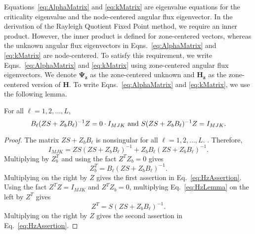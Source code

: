 Equations~\ref{eq:AlphaMatrix} and \ref{eq:kMatrix} are eigenvalue equations for the criticality eigenvalue and the node-centered angular flux eigenvector. In the derivation of the Rayleigh Quotient Fixed Point method, we require an inner product. However, the inner product is defined for zone-centered vectors, whereas the unknown angular flux eigenvectors in Eqns.~\ref{eq:AlphaMatrix} and \ref{eq:kMatrix} are node-centered. To satisfy this requirement, we write Eqns.~\ref{eq:AlphaMatrix} and \ref{eq:kMatrix} using zone-centered angular flux eigenvectors. We denote $\mathbf{\Psi_{z}}$ as the zone-centered unknown and $\mathbf{H_{z}}$ as the zone-centered version of $\mathbf{H}$. To write Eqns.~\ref{eq:AlphaMatrix} and \ref{eq:kMatrix}, we use the following lemma.
\begin{lemma}
For all $\ell = 1, 2, \dots, L$,
	\begin{equation}
		B_{\ell}(ZS + Z_{b}B_{\ell})^{-1}Z = 0 \cdot I_{MJK} \text{ and } S(ZS + Z_{b}B_{\ell})^{-1}Z = I_{MJK}. \\
		\label{eq:HzAssertion}
	\end{equation}
	\label{lemma:Hz}
\end{lemma}
\begin{proof}
	The matrix $ZS + Z_{b}B_{\ell}$ is nonsingular for all $\ell = 1, 2, \dots, L.$ \cite{brown_linear_1995}. Therefore,
	\begin{equation}
		I_{MJK} = ZS(ZS + Z_{b}B_{\ell})^{-1} + Z_{b}B_{\ell}(ZS + Z_{b}B_{\ell})^{-1}.
		\label{eq:HzLemma}
	\end{equation}
	Multiplying by $Z_{b}^{T}$ and using the fact $Z^{T}Z_{b} = 0$ gives
	\begin{equation}
		Z_{b}^{T} = B_{\ell}(ZS + Z_{b}B_{\ell})^{-1}.
	\end{equation}
	Multiplying on the right by $Z$ gives the first assertion in Eq.~\ref{eq:HzAssertion}. Using the fact $Z^{T}Z = I_{MJK}$ and $Z^{T}Z_{b} = 0$, multiplying Eq.~\ref{eq:HzLemma} on the left by $Z^{T}$ gives
	\begin{equation}
		Z^{T} = S(ZS + Z_{b}B_{\ell})^{-1}.
	\end{equation}
	Multiplying on the right by $Z$ gives the second assertion in Eq.~\ref{eq:HzAssertion}.
\end{proof}

